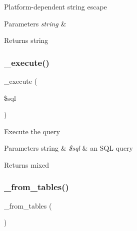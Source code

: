 Platform-\/dependent string escape


\begin{DoxyParams}{Parameters}
{\em string} & \\
\hline
\end{DoxyParams}
\begin{DoxyReturn}{Returns}
string 
\end{DoxyReturn}
\mbox{\label{class_c_i___d_b__mysqli__driver_a114ab675d89bf8324a41785fb475e86d}} 
\subsubsection{\texorpdfstring{\+\_\+execute()}{\_execute()}}
{\footnotesize\ttfamily \+\_\+execute (\begin{DoxyParamCaption}\item[{}]{\$sql }\end{DoxyParamCaption})\hspace{0.3cm}{\ttfamily [protected]}}

Execute the query


\begin{DoxyParams}[1]{Parameters}
string & {\em \$sql} & an S\+QL query \\
\hline
\end{DoxyParams}
\begin{DoxyReturn}{Returns}
mixed 
\end{DoxyReturn}
\mbox{\label{class_c_i___d_b__mysqli__driver_aef43f7e3e7b71d337ff3724c5eb14f10}} 
\subsubsection{\texorpdfstring{\+\_\+from\+\_\+tables()}{\_from\_tables()}}
{\footnotesize\ttfamily \+\_\+from\+\_\+tables (\begin{DoxyParamCaption}{ }\end{DoxyParamCaption})\hspace{0.3cm}{\ttfamily [protected]}}

